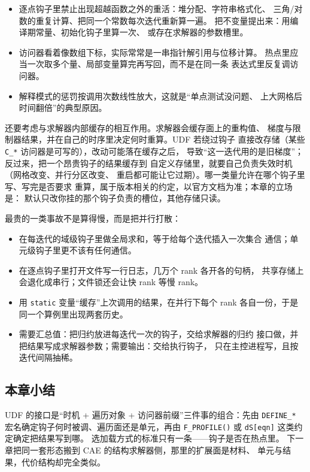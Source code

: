 \documentclass[12pt,a4paper,fontset=fandol]{ctexbook}
\newcommand{\Fn}[1]{\texttt{#1()}}
\newcommand{\Tp}[1]{\texttt{#1}}
\newcommand{\Lang}[1]{\textsf{#1}}
\newcommand{\DomCAE}{\Lang{CAE}}
\begin{document}
\begin{itemize}
  \item 逐点钩子里禁止出现超越函数之外的重活：堆分配、字符串格式化、
        三角/对数的重复计算、把同一个常数每次迭代重新算一遍。
        把不变量提出来：用编译期常量、初始化钩子里算一次、
        或存在求解器的参数槽里。
  \item 访问器看着像数组下标，实际常常是一串指针解引用与位移计算。
        热点里应当一次取多个量、局部变量算完再写回，而不是在同一条
        表达式里反复调访问器。
  \item 解释模式的惩罚按调用次数线性放大，这就是``单点测试没问题、
        上大网格后时间翻倍''的典型原因。
\end{itemize}

还要考虑与求解器内部缓存的相互作用。求解器会缓存面上的重构值、
梯度与限制器结果，并在自己的时序里决定何时重算。UDF 若绕过钩子
直接改存储（某些 \Tp{C\_*} 访问器是可写的），改动可能落在缓存之后，
导致``这一迭代用的是旧梯度''；反过来，把一个昂贵钩子的结果缓存到
自定义存储里，就要自己负责失效时机（网格改变、并行分区改变、
重启都可能让它过期）。哪一类量允许在哪个钩子里写、写完是否要求
重算，属于版本相关的约定，以官方文档为准；本章的立场是：
默认只改你挂的那个钩子负责的槽位，其他存储只读。

\begin{warning}[title={在 UDF 里做全局归约或阻塞 IO}]
最贵的一类事故不是算得慢，而是把并行打散：
\begin{itemize}
  \item 在每迭代的域级钩子里做全局求和，等于给每个迭代插入一次集合
        通信；单元级钩子里更不该有任何通信。
  \item 在逐点钩子里打开文件写一行日志，几万个 rank 各开各的句柄，
        共享存储上会退化成串行；文件锁还会让快 rank 等慢 rank。
  \item 用 \Tp{static} 变量``缓存''上次调用的结果，在并行下每个 rank
        各自一份，于是同一个算例里出现两套历史。
  \item 需要汇总值：把归约放进每迭代一次的钩子，交给求解器的归约
        接口做，并把结果写成求解器参数；需要输出：交给执行钩子，
        只在主控进程写，且按迭代间隔抽稀。
\end{itemize}
\end{warning}

\subsection*{本章小结}
UDF 的接口是``时机 + 遍历对象 + 访问器前缀''三件事的组合：先由
\Tp{DEFINE\_*} 宏名确定钩子何时被调、遍历面还是单元，再由
\Fn{F\_PROFILE} 或 \Tp{dS[eqn]} 这类约定确定把结果写到哪。
选加载方式的标准只有一条——钩子是否在热点里。
下一章把同一套形态搬到 \DomCAE{} 的结构求解器侧，那里的扩展面是材料、
单元与结果，代价结构却完全类似。
\end{document}
